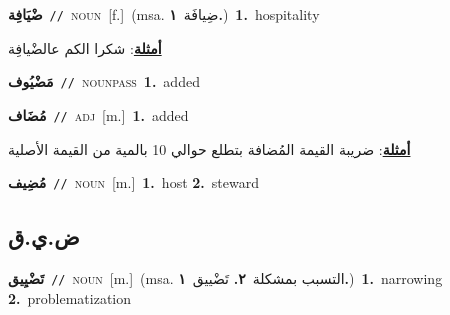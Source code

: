 \documentclass[10pt,a4paper,twoside]{article} %
\begin{document}
\begin{multicols}{2}
{\setlength\topsep{0pt}\textbf{\foreignlanguage{arabic}{ضْيَافِة}}\ {\color{gray}\texttt{//}\color{black}}\ \textsc{noun}\ [f.]\ \color{gray}(msa. \foreignlanguage{arabic}{ضِيافَة}~\foreignlanguage{arabic}{\textbf{١.}})\color{black}\ \textbf{1.}~hospitality\  \begin{flushright}\color{gray}\foreignlanguage{arabic}{\textbf{\underline{\foreignlanguage{arabic}{أمثلة}}}: شكرا الكم عالضْيافِة}\end{flushright}\color{black}} \vspace{2mm}

{\setlength\topsep{0pt}\textbf{\foreignlanguage{arabic}{مَضْيُوف}}\ {\color{gray}\texttt{//}\color{black}}\ \textsc{noun\textunderscore pass}\ \textbf{1.}~added\ } \vspace{2mm}

{\setlength\topsep{0pt}\textbf{\foreignlanguage{arabic}{مُضَاف}}\ {\color{gray}\texttt{//}\color{black}}\ \textsc{adj}\ [m.]\ \textbf{1.}~added\  \begin{flushright}\color{gray}\foreignlanguage{arabic}{\textbf{\underline{\foreignlanguage{arabic}{أمثلة}}}: ضريبة القيمة المُضافة بتطلع حوالي 10 بالمية من القيمة الأصلية}\end{flushright}\color{black}} \vspace{2mm}

{\setlength\topsep{0pt}\textbf{\foreignlanguage{arabic}{مُضِيف}}\ {\color{gray}\texttt{//}\color{black}}\ \textsc{noun}\ [m.]\ \textbf{1.}~host  \textbf{2.}~steward\ } \vspace{2mm}

\vspace{-3mm}
\subsection*{\color{blue}\foreignlanguage{arabic}{ض.ي.ق}\color{blue}{}} 

{\setlength\topsep{0pt}\textbf{\foreignlanguage{arabic}{تَضْيِيق}}\ {\color{gray}\texttt{//}\color{black}}\ \textsc{noun}\ [m.]\ \color{gray}(msa. \foreignlanguage{arabic}{التسبب بمشكلة}~\foreignlanguage{arabic}{\textbf{٢.}}  \foreignlanguage{arabic}{تَضْييق}~\foreignlanguage{arabic}{\textbf{١.}})\color{black}\ \textbf{1.}~narrowing  \textbf{2.}~problematization\ } \vspace{2mm}


\end{multicols}
\end{document}
